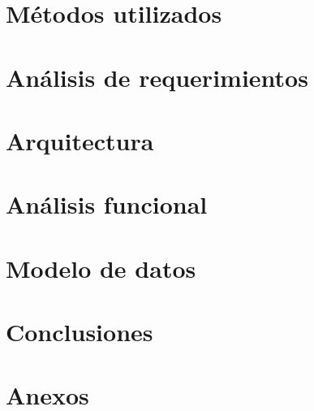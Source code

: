 \documentclass[letter,12pt]{book}
\begin{document}
  \chapter{Métodos utilizados}
  
  
  \chapter{Análisis de requerimientos}
  \label{chap:analisis_requerimientos}
    
  
  \chapter{Arquitectura}
  \label{chap:arquitectura}
    
  
  \chapter{Análisis funcional}
  \label{chap:analisis_funcional}
     
  
  \chapter{Modelo de datos}  
  \label{chap:modelo_datos}
  
  
  \chapter{Conclusiones}
  
  
  
  
  
  \renewcommand\appendixname{Anexo}
  \chapter{Anexos}
   \appendix
   
  
\end{document}
